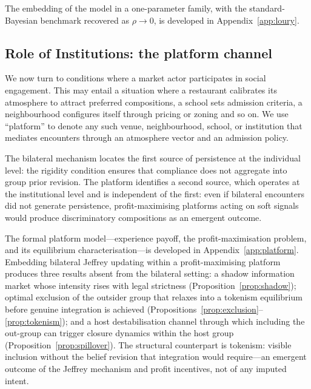 \documentclass[pdflatex,sn-basic]{sn-jnl}
\theoremstyle{thmstyleone}
\numberwithin{proposition}{subsection}
\begin{document}
The embedding of the model in a one-parameter family, with the
standard-Bayesian benchmark recovered as $\rho \to 0$, is developed
in Appendix~\ref{app:loury}.

\subsection{Role of Institutions: the platform channel}
\label{sec:platform}

We now turn to conditions where a market actor participates in social engagement. This may entail a situation where a restaurant calibrates its atmosphere to attract preferred compositions, a
school sets admission criteria, a neighbourhood configures itself
through pricing or zoning and so on. We use ``platform'' to denote any such
venue, neighbourhood, school, or institution that mediates
encounters through an atmosphere vector and an admission policy.

The bilateral mechanism locates the first source of persistence at
the individual level: the rigidity condition ensures that compliance
does not aggregate into group prior revision. The platform identifies
a second source, which operates at the institutional level and is
independent of the first: even if bilateral encounters did not
generate persistence, profit-maximising platforms acting on soft
signals would produce discriminatory compositions as an emergent
outcome.

The formal platform model---experience payoff, the
profit-maximisation problem, and its equilibrium
characterisation---is developed in Appendix~\ref{app:platform}.
Embedding bilateral Jeffrey updating within a profit-maximising
platform produces three results absent from the bilateral setting: a
shadow information market whose intensity rises with legal strictness
(Proposition~\ref{prop:shadow}); optimal exclusion of the outsider
group that relaxes into a tokenism equilibrium before genuine
integration is achieved
(Propositions~\ref{prop:exclusion}--\ref{prop:tokenism}); and a host
destabilisation channel through which including the out-group can
trigger closure dynamics within the host group
(Proposition~\ref{prop:spillover}). The structural counterpart is
tokenism: visible inclusion without the belief revision that
integration would require---an emergent outcome of the Jeffrey
mechanism and profit incentives, not of any imputed intent.
\end{document}
